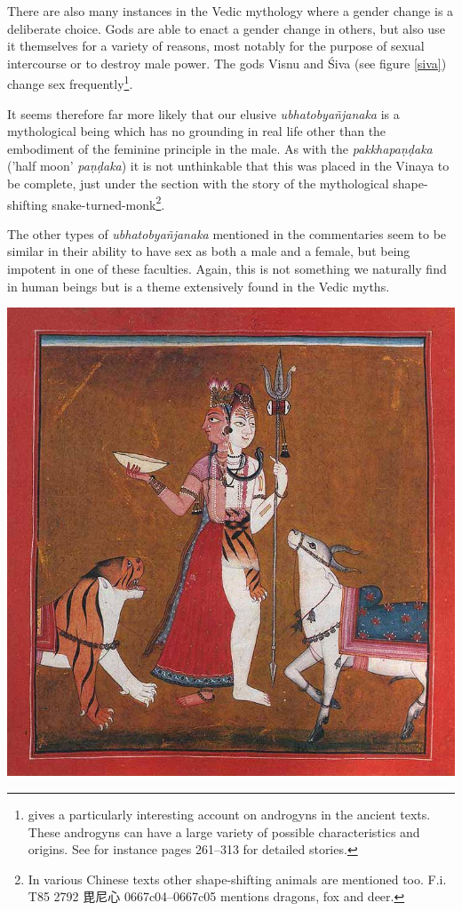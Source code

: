There are also many instances in the Vedic mythology where a gender change is a deliberate choice. Gods are able to enact a gender change in others, but also use it themselves for a variety of reasons, most notably for the purpose of sexual intercourse or to destroy male power. The gods Visnu and Śiva (see figure \ref{siva}) change sex frequently\footnote{\cite{wendy} gives a particularly interesting account on androgyns in the ancient texts. These androgyns can have a large variety of possible characteristics and origins. See for instance pages 261–313 for detailed stories.}.

It seems therefore far more likely that our elusive {\em ubhatob­yañ­janaka} is a mythological being which has no grounding in real life other than the embodiment of the feminine principle in the male. As with the {\em pakkhapaṇḍaka} ('half moon' {\em paṇḍaka}) it is not unthinkable that this was placed in the Vinaya to be complete, just under the section with the story of the mythological shape-shifting snake-turned-monk\footnote{In various Chinese texts other shape-shifting animals are mentioned too. F.i. T85 2792 毘尼心 0667c04–0667c05 mentions dragons, fox and deer.}.

The other types of {\em ubhatob­yañ­janaka} mentioned in the commentaries seem to be similar in their ability to have sex as both a male and a female, but being impotent in one of these faculties. Again, this is not something we naturally find in human beings but is a theme extensively found in the Vedic myths.

\bigskip
\includegraphics[width=\textwidth]{androgyne.jpg}
\begin{minipage}{\textwidth}
\end{minipage}
\label{siva}

